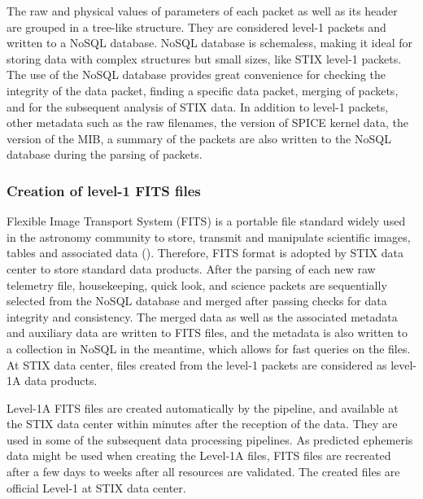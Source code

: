 \documentclass[referee]{aa} %
\begin{document}
The raw and physical values of parameters of each packet as well as its header are grouped  
in a tree-like structure.  They are considered level-1 packets and written to a NoSQL database. 
NoSQL database is schemaless,  making it ideal for storing data with complex
structures but small sizes, like STIX level-1 packets.  
The use of the NoSQL database provides great convenience for checking the integrity of the data packet,
finding a specific data packet, merging of packets, and for the subsequent analysis of STIX data.  
In addition to level-1 packets, 
other metadata such as the raw filenames,  the version of SPICE kernel data, the version of the MIB,
a  summary of the packets are 
also written to the NoSQL database during the parsing of packets. 

\subsubsection{Creation of level-1 FITS files}
Flexible Image Transport System (FITS) is a portable file standard widely used in the astronomy 
community to store, transmit and manipulate scientific images, tables and associated data (\cite{fits}).  
Therefore, FITS format is adopted by STIX data center to store standard data products. 
After the parsing of each new raw telemetry file, housekeeping, quick look, and science packets  
are sequentially selected from the NoSQL database and merged after passing checks for data integrity and consistency. 
The merged data as well as the associated metadata and auxiliary data are written to FITS files, and 
the metadata is also written to a collection in NoSQL in the meantime, which allows for fast queries on the files.
At STIX data center, files created from the level-1 packets are considered as level-1A data products. 

Level-1A FITS files are created automatically by the pipeline, and available at the STIX data center within minutes 
after the reception of the data. They are used in some of the subsequent data processing pipelines.
As predicted ephemeris data might be used when creating the Level-1A files,
FITS files are recreated after a few days to weeks after all resources are validated.
The created files are official Level-1  at STIX data center. 
\end{document}
